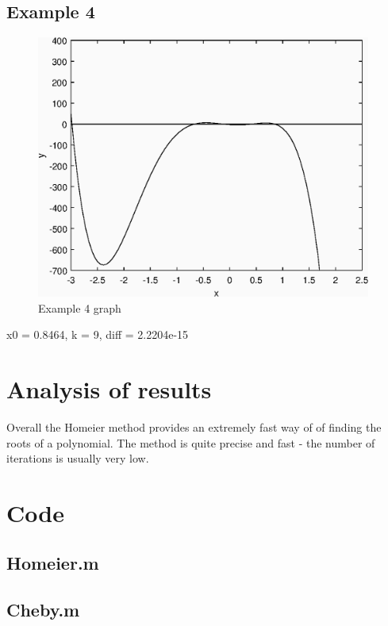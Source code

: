 \documentclass[12pt]{article}
\begin{document}
\subsection{Example 4}
\begin{figure}[!htb]
\centering
\includegraphics[width=110mm]{ex4}
\caption{Example 4 graph}
\end{figure}
x0 = 0.8464,
k = 9,
diff = 2.2204e-15

\section{Analysis of results}
Overall the Homeier method provides an extremely fast way of of finding the roots of a polynomial. The method is quite precise and fast - the number of iterations is usually very low.

\section{Code}
\subsection{Homeier.m}

\subsection{Cheby.m}


\end{document}
